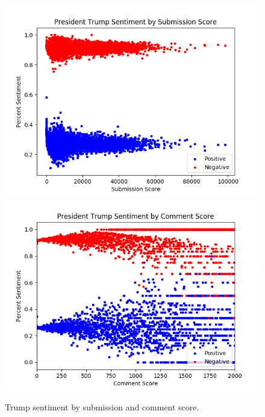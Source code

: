 \documentclass[12pt]{article}
\begin{document}
\begin{figure}[H]
                  \includegraphics[width=\linewidth]{plot5a_djt_sentiment_by_story.png}
        \endminipage\hfill
                  \includegraphics[width=\linewidth]{plot5b_djt_sentiment_by_comment.png}
        \endminipage
        \caption{Trump sentiment by submission and comment score.}
\end{figure}
\end{document}
